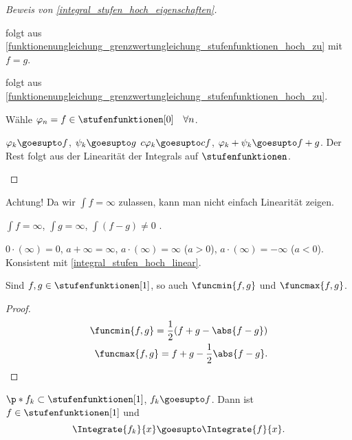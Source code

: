 \begin{proof}[Beweis von \ref{integral_stufen_hoch_eigenschaften}]
  \begin{proofdescription}
    \item[\ref{integral_stufen_hoch_unabhaengig_von_stufenfolge}] folgt aus \ref{funktionenungleichung_grenzwertungleichung_stufenfunktionen_hoch_zu} mit \( f=g \).
    \item[\ref{integral_stufen_hoch_funktionenungleichung_integralungleichung}] folgt aus \ref{funktionenungleichung_grenzwertungleichung_stufenfunktionen_hoch_zu}. 
    \item[\ref{integral_stufen_hoch_gleich_stufenintegral}] Wähle \( \varphi_n=f\in \stufenfunktionen[0] \quad \forall n\). 
    \item[\ref{integral_stufen_hoch_linear}] \( \varphi_k\goesupto f \), \( \psi_k\goesupto g \) \timplies \( c\varphi_k\goesupto cf \), \( \varphi_k+\psi_k\goesupto f+g \). Der Rest folgt aus der Linearität der Integrals auf \( \stufenfunktionen \). 
  \end{proofdescription}
\end{proof}
\begin{bemerkung*}
  Achtung! Da wir \( \int f=\infty \) zulassen, kann man nicht einfach Linearität zeigen.
\end{bemerkung*}
\begin{beispiel*}
  \( \int f= \infty \), \( \int g=\infty \), \( \int (f-g)\neq 0 \) \ia.
\end{beispiel*}
\begin{konvention*}
  \( 0\cdot (\infty)=0 \), \( a+\infty=\infty \), \( a\cdot(\infty)=\infty \) (\( a>0 \)), \( a\cdot(\infty)=-\infty \) (\( a<0 \)). Konsistent mit \ref{integral_stufen_hoch_linear}.
\end{konvention*}
\begin{bemerkung*}
  Sind \( f,g\in \stufenfunktionen[1] \), so auch \( \funcmin{f,g} \) und \( \funcmax{f,g} \).
\end{bemerkung*}
\begin{proof}
  \begin{align*}
    \funcmin{f,g}=\frac{1}{2}(f+g-\abs{f-g})\\
    \funcmax{f,g}=f+g-\frac{1}{2}\abs{f-g}.
  \end{align*}
  
\end{proof}
\begin{lemma}\label{r1_hoch_zu_funktion_r1_integral_hoch_zu}
  \( \p*{f_k}\subset \stufenfunktionen[1] \), \( f_k\goesupto f \). Dann ist \( f\in \stufenfunktionen[1] \) und 
  \begin{equation*}
    \Integrate{f_k}{x}\goesupto \Integrate{f}{x}.
  \end{equation*}
\end{lemma}
